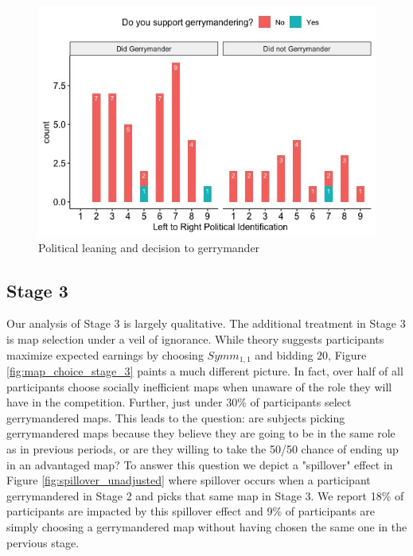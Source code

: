 \documentclass[AER]{AEA}
\begin{document}
\begin{figure}[h]
\centering
\includegraphics[scale=0.5]{gerry_and_politics.jpeg}
\caption{Political leaning and decision to gerrymander}
\label{fig:gerry_and_politics}
\end{figure}

\subsection{Stage 3}
\label{subsection:Stage_3}

Our analysis of Stage 3 is largely qualitative. The additional treatment in Stage 3 is map selection under a veil of ignorance. While theory suggests participants maximize expected earnings by choosing $Symm_{1,1}$ and bidding $20$, Figure \ref{fig:map_choice_stage_3} paints a much different picture. In fact, over half of all participants choose socially inefficient maps when unaware of the role they will have in the competition. Further, just under 30\% of participants select gerrymandered maps. This leads to the question: are subjects picking gerrymandered maps because they believe they are going to be in the same role as in previous periods, or are they willing to take the 50/50 chance of ending up in an advantaged map? To answer this question we depict a "spillover" effect in Figure \ref{fig:spillover_unadjusted} where spillover occurs when a participant gerrymandered in Stage 2 and picks that same map in Stage 3. We report 18\% of participants are impacted by this spillover effect and 9\% of participants are simply choosing a gerrymandered map without having chosen the same one in the pervious stage.
\end{document}
